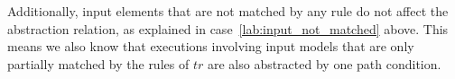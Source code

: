 \begin{pf}
\begin{enumerate}
Additionally, input elements that are not matched by any rule do not affect the abstraction relation, as explained in case~\ref{lab:input_not_matched} above. This means we also know that executions involving input models that are only partially matched by the rules of $tr$ are also abstracted by one path condition. 
\end{enumerate} 
\end{pf} 




